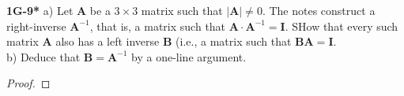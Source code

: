 \documentclass{article}
\begin{document}
\textbf{1G-9*} a) Let $\mathbf{A}$ be a $3 \times 3$ matrix such that $|\mathbf{A}| \neq 0$. The notes construct a right-inverse $\mathbf{A}^{-1}$, that is, a matrix such that $\mathbf{A} \cdot \mathbf{A}^{-1} = \mathbf{I}$. SHow that every such matrix $\mathbf{A}$ also has a left inverse $\mathbf{B}$ (i.e., a matrix such that $\mathbf{BA} = \mathbf{I}$.
\\ b) Deduce that $\mathbf{B} = \mathbf{A}^{-1}$ by a one-line argument.
\begin{proof}

\end{proof}
\end{document}
